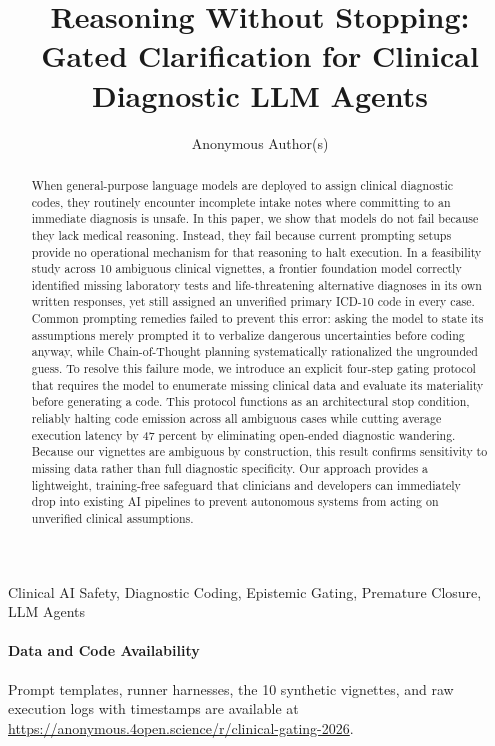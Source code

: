 \documentclass[pmlr,twocolumn,10pt]{jmlr} %
\title[Reasoning Without Stopping]{Reasoning Without Stopping: Gated Clarification for Clinical Diagnostic LLM Agents}
\author{Anonymous Author(s)}
\begin{document}
\maketitle

\begin{abstract}
When general-purpose language models are deployed to assign clinical diagnostic codes, they routinely encounter incomplete intake notes where committing to an immediate diagnosis is unsafe. In this paper, we show that models do not fail because they lack medical reasoning. Instead, they fail because current prompting setups provide no operational mechanism for that reasoning to halt execution. In a feasibility study across 10 ambiguous clinical vignettes, a frontier foundation model correctly identified missing laboratory tests and life-threatening alternative diagnoses in its own written responses, yet still assigned an unverified primary ICD-10 code in every case. Common prompting remedies failed to prevent this error: asking the model to state its assumptions merely prompted it to verbalize dangerous uncertainties before coding anyway, while Chain-of-Thought planning systematically rationalized the ungrounded guess. To resolve this failure mode, we introduce an explicit four-step gating protocol that requires the model to enumerate missing clinical data and evaluate its materiality before generating a code. This protocol functions as an architectural stop condition, reliably halting code emission across all ambiguous cases while cutting average execution latency by 47 percent by eliminating open-ended diagnostic wandering. Because our vignettes are ambiguous by construction, this result confirms sensitivity to missing data rather than full diagnostic specificity. Our approach provides a lightweight, training-free safeguard that clinicians and developers can immediately drop into existing AI pipelines to prevent autonomous systems from acting on unverified clinical assumptions.
\end{abstract}

\begin{keywords}
Clinical AI Safety, Diagnostic Coding, Epistemic Gating, Premature Closure, LLM Agents
\end{keywords}

\paragraph*{Data and Code Availability}
Prompt templates, runner harnesses, the 10 synthetic vignettes, and raw execution logs with timestamps are available at \url{https://anonymous.4open.science/r/clinical-gating-2026}.
\end{document}
